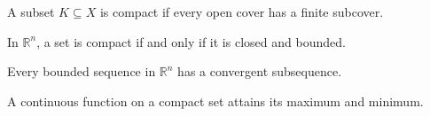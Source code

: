 \begin{definition}\label{def:compact}
A subset $K \subseteq X$ is compact if every open cover has a finite subcover.
\end{definition}

\begin{theorem}\label{thm:heine-borel}
In $\mathbb{R}^n$, a set is compact if and only if it is closed and bounded.
\end{theorem}

\begin{lemma}\label{lem:bolzano}
Every bounded sequence in $\mathbb{R}^n$ has a convergent subsequence.
\end{lemma}

\begin{theorem}\label{thm:evt}
A continuous function on a compact set attains its maximum and minimum.
\end{theorem}
